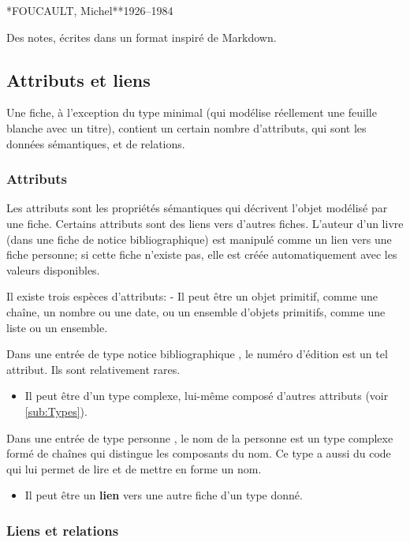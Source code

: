 \documentclass[11pt]{article}
\newcommand\tzcard[1]{%
    \begin{minipage}[t]{1\columnwidth}%
    \begin{shaded}%
    \sffamily #1
    \end{shaded}%
    \end{minipage}
}
\begin{document}
\tzcard{**FOUCAULT, Michel**\hfill1926--1984}

Des notes, écrites dans un format inspiré de Markdown.

\subsection{Attributs et liens}\label{attributs-et-liens}

Une fiche, à l'exception du type minimal (qui modélise réellement une
feuille blanche avec un titre), contient un certain nombre d'attributs,
qui sont les données sémantiques, et de relations.

\subsubsection{Attributs}\label{par:attributs}

Les attributs sont les propriétés sémantiques qui décrivent l'objet
modélisé par une fiche. Certains attributs sont des liens vers d'autres
fiches. L'auteur d'un livre (dans une fiche de notice bibliographique)
est manipulé comme un lien vers une fiche personne; si cette fiche
n'existe pas, elle est créée automatiquement avec les valeurs
disponibles.

Il existe trois espèces d'attributs: - Il peut être un objet primitif,
comme une chaîne, un nombre ou une date, ou un ensemble d'objets
primitifs, comme une liste ou un ensemble.

Dans une entrée de type \og notice bibliographique \fg{}, le numéro
d'édition est un tel attribut. Ils sont relativement rares.

\begin{itemize}
\itemsep1pt\parskip0pt
\item
  Il peut être d'un type complexe, lui-même composé d'autres attributs
  (voir \vref{sub:Types}).
\end{itemize}

Dans une entrée de type \og personne \fg{}, le nom de la personne est un
type complexe formé de chaînes qui distingue les composants du nom. Ce
type a aussi du code qui lui permet de lire et de mettre en forme un
nom.

\begin{itemize}
\itemsep1pt\parskip0pt
\item
  Il peut être un \textbf{lien} vers une autre fiche d'un type donné.
\end{itemize}

\subsubsection{Liens et relations}\label{liens-et-relations}
\end{document}

